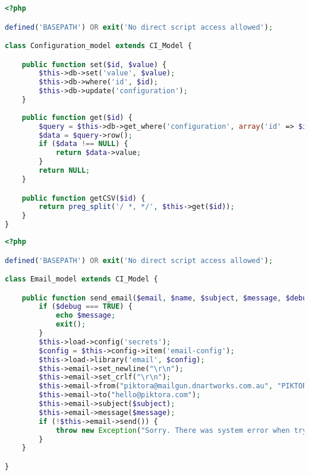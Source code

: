 \begin{lstlisting}[language=php, caption=Configuration\_model.php]
<?php

defined('BASEPATH') OR exit('No direct script access allowed');

class Configuration_model extends CI_Model {

    public function set($id, $value) {
        $this->db->set('value', $value);
        $this->db->where('id', $id);
        $this->db->update('configuration');
    }
    
    public function get($id) {
        $query = $this->db->get_where('configuration', array('id' => $id));
        $data = $query->row();
        if ($data !== NULL) {
            return $data->value;
        }
        return NULL;
    }

    public function getCSV($id) {
        return preg_split('/ *, */', $this->get($id));
    }
}
\end{lstlisting}

\begin{lstlisting}[language=php, caption=Email\_model.php]
<?php

defined('BASEPATH') OR exit('No direct script access allowed');

class Email_model extends CI_Model {

    public function send_email($email, $name, $subject, $message, $debug = FALSE) {
        if ($debug === TRUE) {
            echo $message;
            exit();
        }
        $this->load->config('secrets');
        $config = $this->config->item('email-config');
        $this->load->library('email', $config);
        $this->email->set_newline("\r\n");
        $this->email->set_crlf("\r\n");
        $this->email->from("piktora@mailgun.dnartworks.com.au", "PIKTORA");
        $this->email->to("hello@piktora.com");
        $this->email->subject($subject);
        $this->email->message($message);
        if (!$this->email->send()) {
            throw new Exception("Sorry. There was system error when trying to sent your email. Please try again later.");
        }
    }

}
\end{lstlisting}



